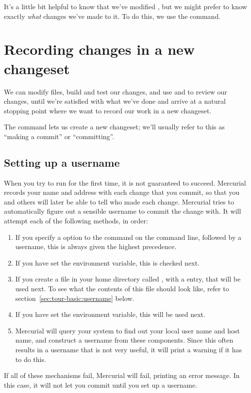 It's a little bit helpful to know that we've modified
, but we might prefer to know exactly \emph{what}
changes we've made to it.  To do this, we use the 
command.

\section{Recording changes in a new changeset}

We can modify files, build and test our changes, and use
 and  to review our changes, until we're
satisfied with what we've done and arrive at a natural stopping point
where we want to record our work in a new changeset.

The  command lets us create a new changeset; we'll
usually refer to this as ``making a commit'' or ``committing''.  

\subsection{Setting up a username}

When you try to run  for the first time, it is not
guaranteed to succeed.  Mercurial records your name and address with
each change that you commit, so that you and others will later be able
to tell who made each change.  Mercurial tries to automatically figure
out a sensible username to commit the change with.  It will attempt
each of the following methods, in order:
\begin{enumerate}
\item If you specify a  option to the 
  command on the command line, followed by a username, this is always
  given the highest precedence.
\item If you have set the  environment variable, this is
  checked next.
\item If you create a file in your home directory called
  , with a  entry, that will be
  used next.  To see what the contents of this file should look like,
  refer to section~\ref{sec:tour-basic:username} below.
\item If you have set the  environment variable, this
  will be used next.
\item Mercurial will query your system to find out your local user
  name and host name, and construct a username from these components.
  Since this often results in a username that is not very useful, it
  will print a warning if it has to do this.
\end{enumerate}
If all of these mechanisms fail, Mercurial will fail, printing an
error message.  In this case, it will not let you commit until you set
up a username.

